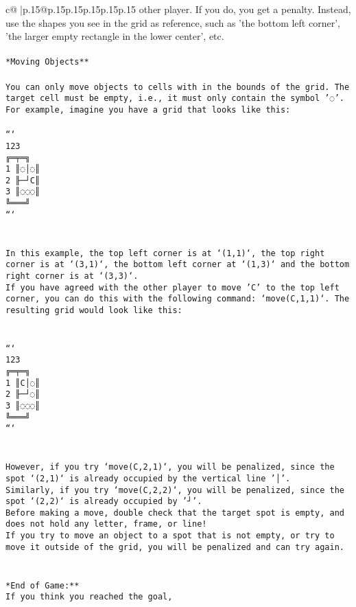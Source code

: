 \documentclass{article}
\begin{document}
{\begin{supertabular}{c@{$\;$}|p{.15\linewidth}@{}p{.15\linewidth}p{.15\linewidth}p{.15\linewidth}p{.15\linewidth}p{.15\linewidth}}
{{{other player. If you do, you get a penalty. Instead, use the shapes you see in the grid as reference, such as 'the bottom left corner', 'the larger empty rectangle in the lower center', etc.\\ \tt \\ \tt **Moving Objects**\\ \tt \\ \tt * You can only move objects to cells with in the bounds of the grid. The target cell must be empty, i.e., it must only contain the symbol '◌'.\\ \tt * For example, imagine you have a grid that looks like this: \\ \tt \\ \tt ```\\ \tt     123\\ \tt    ╔═╤═╗\\ \tt  1 ║◌│◌║\\ \tt  2 ╟─┘C║\\ \tt  3 ║◌◌◌║\\ \tt    ╚═══╝\\ \tt ```\\ \tt \\ \tt \\ \tt * In this example, the top left corner is at `(1,1)`, the top right corner is at `(3,1)`, the bottom left corner at `(1,3)` and the bottom right corner is at `(3,3)`.\\ \tt * If you have agreed with the other player to move 'C' to the top left corner, you can do this with the following command: `move(C,1,1)`. The resulting grid would look like this: \\ \tt \\ \tt \\ \tt ```\\ \tt     123\\ \tt    ╔═╤═╗\\ \tt  1 ║C│◌║\\ \tt  2 ╟─┘◌║\\ \tt  3 ║◌◌◌║\\ \tt    ╚═══╝\\ \tt ```\\ \tt \\ \tt \\ \tt * However, if you try `move(C,2,1)`, you will be penalized, since the spot `(2,1)` is already occupied by the vertical line '│'.\\ \tt * Similarly, if you try `move(C,2,2)`, you will be penalized, since the spot `(2,2)` is already occupied by '┘'.\\ \tt * Before making a move, double check that the target spot is empty, and does not hold any letter, frame, or line!\\ \tt * If you try to move an object to a spot that is not empty, or try to move it outside of the grid, you will be penalized and can try again.\\ \tt \\ \tt \\ \tt **End of Game:**\\ \tt If you think you reached the goal, }}}
\end{supertabular}}
\end{document}
